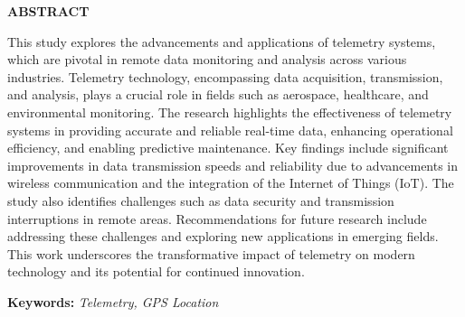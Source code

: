 \begin{center}
{\bf ABSTRACT}\\[36pt]
\end{center}
{\baselineskip

This study explores the advancements and applications of telemetry systems, which are pivotal in remote data monitoring and analysis across various industries. Telemetry technology, encompassing data acquisition, transmission, and analysis, plays a crucial role in fields such as aerospace, healthcare, and environmental monitoring. The research highlights the effectiveness of telemetry systems in providing accurate and reliable real-time data, enhancing operational efficiency, and enabling predictive maintenance. Key findings include significant improvements in data transmission speeds and reliability due to advancements in wireless communication and the integration of the Internet of Things (IoT). The study also identifies challenges such as data security and transmission interruptions in remote areas. Recommendations for future research include addressing these challenges and exploring new applications in emerging fields. This work underscores the transformative impact of telemetry on modern technology and its potential for continued innovation.

}
\bigskip
\textbf{Keywords:} \textit{Telemetry, GPS Location}
